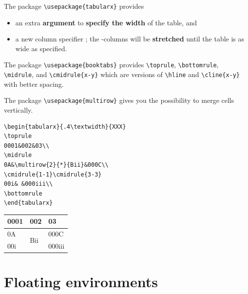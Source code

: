 \begin{frame}[fragile]

The package \lstinline|\usepackage{tabularx}| provides 
\begin{itemize}
	\item an extra \textbf{argument} to \textbf{specify the width} of the table, and
	
	\item a new column specifier ; the -columns will be \textbf{stretched} until the table is as wide as specified.
\end{itemize}

The package \lstinline|\usepackage{booktabs}| provides \lstinline|\toprule|, \lstinline|\bottomrule|, \lstinline|\midrule|, and \lstinline|\cmidrule{x-y}| which are versions of \lstinline|\hline| and \lstinline|\cline{x-y}| with better spacing.

\smallskip

The package 
\lstinline|\usepackage{multirow}| gives you the possibility to merge cells vertically.

\begin{multicols}{2}
	
\begin{lstlisting}
\begin{tabularx}{.4\textwidth}{XXX}
\toprule
0001&002&03\\
\midrule
0A&\multirow{2}{*}{Bii}&000C\\
\cmidrule{1-1}\cmidrule{3-3}
00i& &000iii\\
\bottomrule
\end{tabularx}
\end{lstlisting}
	
	\columnbreak
	
	\begin{tabularx}{.4\textwidth}{XXX}
		\toprule
		0001&002&03\\
		\midrule
		0A&\multirow{2}{*}{Bii}&000C\\
		\cmidrule{1-1}\cmidrule{3-3}
		00i& &000iii\\
		\bottomrule
	\end{tabularx}
	
\end{multicols}

\end{frame}


\section{Floating environments}

